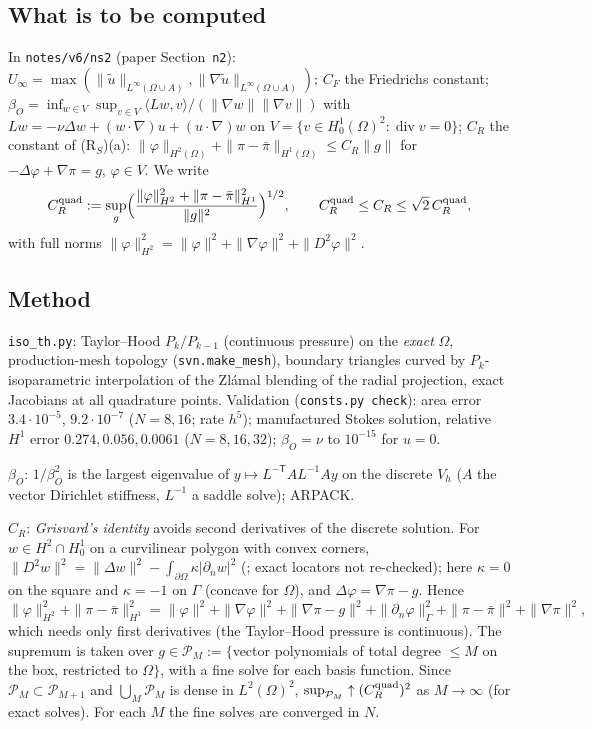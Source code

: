 \documentclass[11pt]{article}
\theoremstyle{definition}
\theoremstyle{remark}
\newcommand{\norm}[1]{\|#1\|}
\newcommand{\dn}{\partial_n}
\newcommand{\ut}{\tilde u}
\renewcommand{\div}{\operatorname{div}}
\begin{document}
\subsection{What is to be computed}
In \texttt{notes/v6/ns2} (paper Section~\texttt{n2}): $U_\infty=\max(\norm{\ut}_{L^\infty(\Omega\cup A)},\norm{\nabla\ut}_{L^\infty(\Omega\cup A)})$;
$C_F$ the Friedrichs constant; $\beta_O=\inf_{w\in V}\sup_{v\in V}\langle Lw,v\rangle/(\norm{\nabla w}\norm{\nabla v})$ with
$Lw=-\nu\Delta w+(w\cdot\nabla)u+(u\cdot\nabla)w$ on $V=\{v\in H^1_0(\Omega)^2:\div v=0\}$; $C_R$ the constant of (R$_S$)(a):
$\norm\varphi_{H^2(\Omega)}+\norm{\pi-\bar\pi}_{H^1(\Omega)}\le C_R\norm g$ for $-\Delta\varphi+\nabla\pi=g$, $\varphi\in V$. We write
\[
C_R^{\rm quad}:=\sup_g\Bigl(\frac{\norm\varphi^2_{H^2}+\norm{\pi-\bar\pi}^2_{H^1}}{\norm g^2}\Bigr)^{1/2},\qquad C_R^{\rm quad}\le C_R\le\sqrt2\,C_R^{\rm quad},
\]
with full norms $\norm\varphi^2_{H^2}=\norm\varphi^2+\norm{\nabla\varphi}^2+\norm{D^2\varphi}^2$.

\subsection{Method}
\texttt{iso\_th.py}: Taylor--Hood $P_k/P_{k-1}$ (continuous pressure) on the \emph{exact} $\Omega$, production-mesh topology (\texttt{svn.make\_mesh}), boundary triangles curved by $P_k$-isoparametric interpolation of the Zl\'amal blending of the radial projection, exact Jacobians at all quadrature points. Validation (\texttt{consts.py check}): area error $3.4\cdot10^{-5}$, $9.2\cdot10^{-7}$ ($N=8,16$; rate $h^5$); manufactured Stokes solution, relative $H^1$ error $0.274,0.056,0.0061$ ($N=8,16,32$); $\beta_O=\nu$ to $10^{-15}$ for $u=0$.

$\beta_O$: $1/\beta_O^2$ is the largest eigenvalue of $y\mapsto L^{-\mathsf T}AL^{-1}Ay$ on the discrete $V_h$ ($A$ the vector Dirichlet stiffness, $L^{-1}$ a saddle solve); ARPACK.

$C_R$: \emph{Grisvard's identity} avoids second derivatives of the discrete solution. For $w\in H^2\cap H^1_0$ on a curvilinear polygon with convex corners, $\norm{D^2w}^2=\norm{\Delta w}^2-\int_{\partial\Omega}\kappa|\dn w|^2$ (\cite[\S3.1.1 (curved part), \S4.3.1 (corners)]{Grisvard}; exact locators not re-checked); here $\kappa=0$ on the square and $\kappa=-1$ on $\Gamma$ (concave for $\Omega$), and $\Delta\varphi=\nabla\pi-g$. Hence
\[
\norm\varphi^2_{H^2}+\norm{\pi-\bar\pi}^2_{H^1}=\norm\varphi^2+\norm{\nabla\varphi}^2+\norm{\nabla\pi-g}^2+\norm{\dn\varphi}^2_{\Gamma}+\norm{\pi-\bar\pi}^2+\norm{\nabla\pi}^2 ,
\]
which needs only first derivatives (the Taylor--Hood pressure is continuous). The supremum is taken over $g\in\mathcal P_M:=\{$vector polynomials of total degree $\le M$ on the box, restricted to $\Omega\}$, with a fine solve for each basis function. Since $\mathcal P_M\subset\mathcal P_{M+1}$ and $\bigcup_M\mathcal P_M$ is dense in $L^2(\Omega)^2$, $\sup_{\mathcal P_M}\uparrow(C_R^{\rm quad})^2$ as $M\to\infty$ (for exact solves). For each $M$ the fine solves are converged in $N$.
\end{document}
